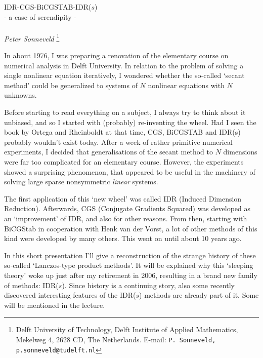 \documentclass[12pt,a4]{article}
\begin{document}
\setcounter{page}{4}
\begin{center}
{\Large IDR-CGS-BiCGSTAB-IDR($s$)\\- a case of serendipity -\\
\mbox{}\\}
{\em Peter Sonneveld}
\footnote{Delft University of Technology,
Delft Institute of Applied Mathematics, Mekelweg 4, 2628 CD, The Netherlands.
E-mail: {\tt P. Sonneveld, p.sonneveld@tudelft.nl}}
\end{center}
In about 1976, I was preparing a renovation of the elementary course 
on numerical analysis in Delft University. In relation to the problem 
of solving a single nonlinear equation iteratively, I wondered whether 
the so-called `secant method' could be generalized to systems of $N$ nonlinear 
equations with $N$ unknowns.
\par
Before starting to read everything on a subject, I always try 
to think about it unbiased, and so I started with (probably) re-inventing the 
wheel. 
Had I seen the book by Ortega and Rheinboldt at that 
time, CGS, BiCGSTAB and IDR(s) probably wouldn't exist today. 
After a week of rather primitive numerical experiments, I decided that
generalisations of the secant method to $N$ dimensions were far too
complicated for an elementary course. However, the experiments 
showed a surprising phenomenon, that appeared to be useful in the 
machinery of solving large sparse nonsymmetric {\em linear} systems. 
\par
The first application of this `new wheel' was called IDR (Induced 
Dimension Reduction). Afterwards, CGS (Conjugate Gradients Squared)
was developed as an `improvement' of IDR, and also for other reasons.
From then, starting with BiCGStab in cooperation with Henk van der Vorst, 
a lot of other methods of this kind
were developed by many others. This went on until about 10 years ago.  
\par
In this short presentation I'll give a reconstruction
of the strange history of these so-called 
`Lanczos-type product methods'.
It will be explained why this `sleeping theory' woke up just after
my retirement in 2006,
resulting in a brand new family of methods: IDR($s$).
Since history is a continuing story, also some recently discovered 
interesting features of the IDR($s$) methods are already part of it.
Some will be mentioned in the lecture.    
\end{document}
